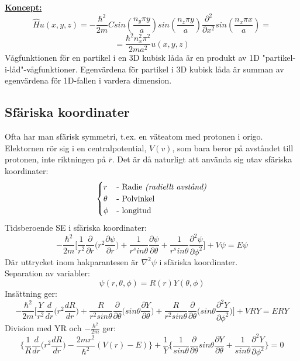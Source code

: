 \documentclass{article}
\begin{document}
  \underline{\textbf{Koncept:}}\\
  \[
    \hat{H}u(x,y,z)=-\frac{\hbar^2}{2m}Csin(\frac{n_y\pi y}{a})sin(\frac{n_z\pi y}{a})\frac{\partial^2}{\partial x^2}sin(\frac{n_x\pi x}{a})=
  \]
  \[
    =\frac{\hbar^2n_x^2\pi^2}{2ma^2}u(x,y,z)
  \]
  Vågfunktionen för en partikel i en 3D kubisk låda är en produkt av 1D "partikel-i-låd"-vågfunktioner. Egenvärdena för partikel i 3D kubisk låda är summan av egenvärdena för 1D-fallen i vardera dimension.

  \subsection{Sfäriska koordinater}
    Ofta har man sfärisk symmetri, t.ex. en väteatom med protonen i origo.\\

    Elektornen rör sig i en centralpotential, $V(v)$, som bara beror på avståndet till protonen, inte riktningen på $\bar{r}$. Det är då naturligt att använda sig utav sfäriska koordinater:
    \[
    \begin{cases}
      r&\text{- Radie \textit{(radiellt avstånd)}}\\
      \theta&\text{- Polvinkel}\\
      \phi&\text{- longitud}
    \end{cases}
    \]
    Tidsberoende SE i sfäriska koordinater:
    \[
      -\frac{\hbar^2}{2m}\bigg[\frac{1}{r^2}\frac{\partial}{\partial r}\big(r^2\frac{\partial \psi}{\partial r}\big)+\frac{1}{r^sin\theta}\frac{\partial\psi}{\partial\theta}+\frac{1}{r^sin\theta}\frac{\partial^2\psi}{\partial\phi^2}\bigg]+V\psi=E\psi
    \]
    Där uttrycket inom hakparantesen är $\nabla^2\psi$ i sfäriska koordinater.\\

    Separation av variabler:
    \[
      \psi(r,\theta,\phi)=R(r)Y(\theta,\phi)
    \]
    Insättning ger:
    \[
      -\frac{\hbar^2}{2m}\bigg[\frac{Y}{r^2}\frac{d}{dr}\big(r^2\frac{dR}{dr}\big)+\frac{R}{r^2sin\theta}\frac{\partial}{\partial\theta}\big(sin\theta\frac{\partial Y}{\partial\theta}\big)+\frac{R}{r^2sin\theta}\frac{\partial}{\partial\theta}\big(sin\theta\frac{\partial^2 Y}{\partial\phi^2}\big)\bigg]+VRY=ERY
    \]
    Division med YR och $-\frac{\hbar^2}{2m}$ ger:
    \[
      \bigg\{ \frac{1}{R}\frac{d}{dr}\big(r^2\frac{dR}{dr}\big)-\frac{2mr^2}{\hbar^2}(V(r)-E)\bigg\}+\frac{1}{Y}\bigg\{\frac{1}{sin\theta}\frac{\partial}{\partial\theta}sin\theta\frac{\partial Y}{\partial\theta}+\frac{1}{sin\theta}\frac{\partial^2 Y}{\partial\phi^2}\bigg\}=0
    \]
\end{document}
